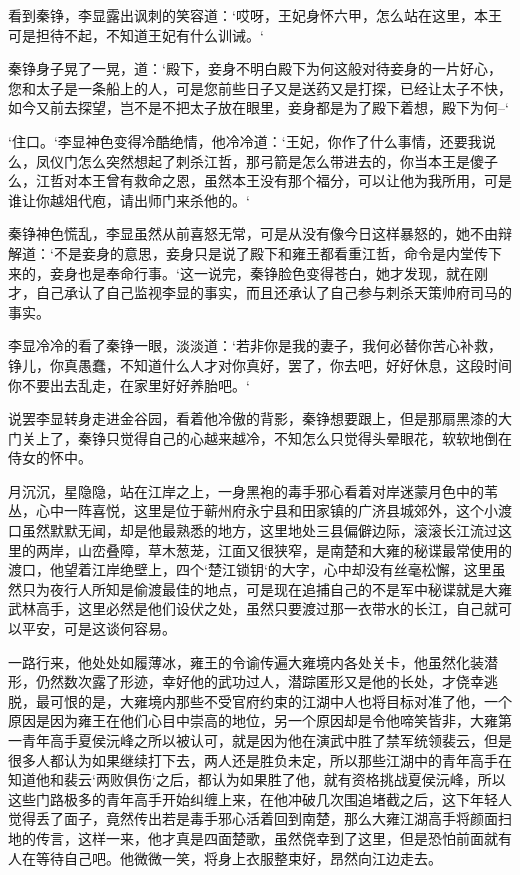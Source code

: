 看到秦铮，李显露出讽刺的笑容道：‘哎呀，王妃身怀六甲，怎么站在这里，本王可是担待不起，不知道王妃有什么训诫。‘

秦铮身子晃了一晃，道：‘殿下，妾身不明白殿下为何这般对待妾身的一片好心，您和太子是一条船上的人，可是您前些日子又是送药又是打探，已经让太子不快，如今又前去探望，岂不是不把太子放在眼里，妾身都是为了殿下着想，殿下为何--‘

‘住口。‘李显神色变得冷酷绝情，他冷冷道：‘王妃，你作了什么事情，还要我说么，凤仪门怎么突然想起了刺杀江哲，那弓箭是怎么带进去的，你当本王是傻子么，江哲对本王曾有救命之恩，虽然本王没有那个福分，可以让他为我所用，可是谁让你越俎代庖，请出师门来杀他的。‘

秦铮神色慌乱，李显虽然从前喜怒无常，可是从没有像今日这样暴怒的，她不由辩解道：‘不是妾身的意思，妾身只是说了殿下和雍王都看重江哲，命令是内堂传下来的，妾身也是奉命行事。‘这一说完，秦铮脸色变得苍白，她才发现，就在刚才，自己承认了自己监视李显的事实，而且还承认了自己参与刺杀天策帅府司马的事实。

李显冷冷的看了秦铮一眼，淡淡道：‘若非你是我的妻子，我何必替你苦心补救，铮儿，你真愚蠢，不知道什么人才对你真好，罢了，你去吧，好好休息，这段时间你不要出去乱走，在家里好好养胎吧。‘

说罢李显转身走进金谷园，看着他冷傲的背影，秦铮想要跟上，但是那扇黑漆的大门关上了，秦铮只觉得自己的心越来越冷，不知怎么只觉得头晕眼花，软软地倒在侍女的怀中。

月沉沉，星隐隐，站在江岸之上，一身黑袍的毒手邪心看着对岸迷蒙月色中的苇丛，心中一阵喜悦，这里是位于蕲州府永宁县和田家镇的广济县城郊外，这个小渡口虽然默默无闻，却是他最熟悉的地方，这里地处三县偏僻边际，滚滚长江流过这里的两岸，山峦叠障，草木葱茏，江面又很狭窄，是南楚和大雍的秘谍最常使用的渡口，他望着江岸绝壁上，四个‘楚江锁钥‘的大字，心中却没有丝毫松懈，这里虽然只为夜行人所知是偷渡最佳的地点，可是现在追捕自己的不是军中秘谍就是大雍武林高手，这里必然是他们设伏之处，虽然只要渡过那一衣带水的长江，自己就可以平安，可是这谈何容易。

一路行来，他处处如履薄冰，雍王的令谕传遍大雍境内各处关卡，他虽然化装潜形，仍然数次露了形迹，幸好他的武功过人，潜踪匿形又是他的长处，才侥幸逃脱，最可恨的是，大雍境内那些不受官府约束的江湖中人也将目标对准了他，一个原因是因为雍王在他们心目中崇高的地位，另一个原因却是令他啼笑皆非，大雍第一青年高手夏侯沅峰之所以被认可，就是因为他在演武中胜了禁军统领裴云，但是很多人都认为如果继续打下去，两人还是胜负未定，所以那些江湖中的青年高手在知道他和裴云‘两败俱伤‘之后，都认为如果胜了他，就有资格挑战夏侯沅峰，所以这些门路极多的青年高手开始纠缠上来，在他冲破几次围追堵截之后，这下年轻人觉得丢了面子，竟然传出若是毒手邪心活着回到南楚，那么大雍江湖高手将颜面扫地的传言，这样一来，他才真是四面楚歌，虽然侥幸到了这里，但是恐怕前面就有人在等待自己吧。他微微一笑，将身上衣服整束好，昂然向江边走去。

